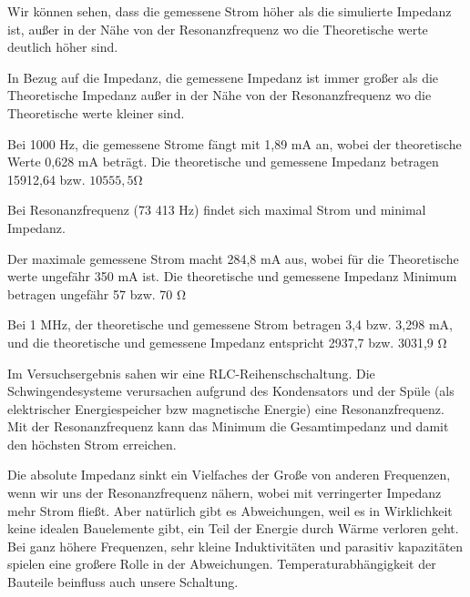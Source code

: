 %
%
Wir können sehen, dass die gemessene Strom höher als die simulierte Impedanz ist, außer in der Nähe von der Resonanzfrequenz wo die Theoretische werte deutlich höher sind.

In Bezug auf die Impedanz, die gemessene Impedanz ist immer großer als die Theoretische Impedanz außer in der Nähe von der Resonanzfrequenz wo die Theoretische werte kleiner sind.

Bei 1000 Hz, die gemessene Strome fängt mit 1,89 $\si{\milli\ampere}$ an, wobei der theoretische Werte 0,628 $\si{\milli\ampere}$ beträgt. Die theoretische und gemessene Impedanz betragen 15912,64 bzw. $10555,5 \si{\ohm}$

Bei Resonanzfrequenz (73 413 Hz) findet sich maximal Strom und minimal Impedanz.

Der maximale gemessene Strom macht 284,8 $\si{\milli\ampere}$ aus, wobei für die Theoretische werte ungefähr 350 $\si{\milli\ampere}$ ist. Die theoretische und gemessene Impedanz Minimum betragen ungefähr 57 bzw.  70 $\si{\ohm}$

Bei 1 MHz, der theoretische und gemessene Strom betragen 3,4 bzw. 3,298 $\si{\milli\ampere}$, und die theoretische und gemessene Impedanz entspricht 2937,7 bzw. 3031,9 $\si{\ohm}$

Im Versuchsergebnis sahen wir eine RLC-Reihenschschaltung. Die Schwingendesysteme verursachen aufgrund des Kondensators und der Spüle (als elektrischer Energiespeicher bzw magnetische Energie) eine Resonanzfrequenz. Mit der Resonanzfrequenz kann das Minimum die Gesamtimpedanz und damit den höchsten Strom erreichen.

Die absolute Impedanz sinkt ein Vielfaches der Große von anderen Frequenzen, wenn wir uns der Resonanzfrequenz nähern, wobei mit verringerter Impedanz mehr Strom fließt. Aber natürlich gibt es Abweichungen, weil es in Wirklichkeit keine idealen Bauelemente gibt, ein Teil der Energie durch Wärme verloren geht. Bei ganz höhere Frequenzen, sehr kleine Induktivitäten und parasitiv kapazitäten spielen eine großere Rolle in der Abweichungen. Temperaturabhängigkeit der Bauteile beinfluss auch unsere Schaltung.
%
%
%
\begin{flushright}
 \textit{\autorA}
\end{flushright}
%
%
%
%